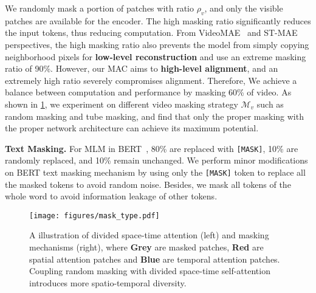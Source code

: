 \documentclass[10pt,twocolumn,letterpaper]{article}
\begin{document}
We randomly mask a portion of patches with ratio $\rho_v$, and only the visible patches are available for the encoder. The high masking ratio significantly reduces the input tokens, thus reducing computation. From VideoMAE~\cite{videomae} and ST-MAE~\cite{st_mae} perspectives, the high masking ratio also prevents the model from simply copying neighborhood pixels for \textbf{low-level reconstruction} and use an extreme masking ratio of 90\%. However, our MAC aims to \textbf{high-level alignment}, and an extremely high ratio severely compromises alignment. Therefore, We achieve a balance between computation and performance by masking 60\% of video. As shown in \cref{fig:masking-type}, we experiment on different video masking strategy $\mathcal{M}_v$ such as random masking and tube masking, and find that only the proper masking with the proper network architecture can achieve its maximum potential. 

\vspace{1mm}\noindent\textbf{Text Masking.} For MLM in BERT~\cite{bert}, 80\% are replaced with \verb+[MASK]+, 10\% are randomly replaced, and 10\% remain unchanged. We perform minor modifications on BERT text masking mechanism by using only the \verb+[MASK]+ token to replace all the masked tokens to avoid random noise. Besides, we mask all tokens of the whole word to avoid information leakage of other tokens. 

\begin{figure}[t]
  \centering
  \texttt{[image: figures/mask\_type.pdf]}
   \caption{A illustration of divided space-time attention (left) and masking mechanisms (right), where \textbf{Grey} are masked patches, \textbf{Red} are spatial attention patches and \textbf{Blue} are temporal attention patches. Coupling random masking with divided space-time self-attention introduces more spatio-temporal diversity.}\vspace{-2mm}
   \label{fig:masking-type}
\end{figure}
\end{document}
